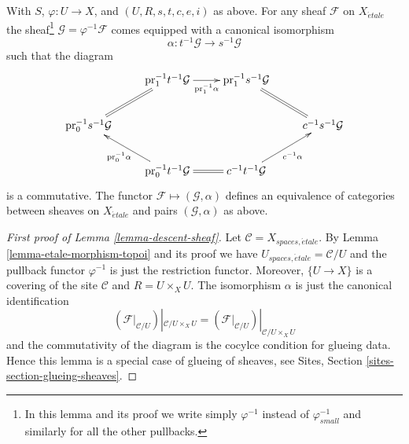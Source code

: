 \begin{lemma}
\label{lemma-descent-sheaf}
With $S$, $\varphi : U \to X$, and $(U, R, s, t, c, e, i)$ as above.
For any sheaf $\mathcal{F}$ on $X_{\acute{e}tale}$ the
sheaf\footnote{In this lemma
and its proof we write simply $\varphi^{-1}$ instead of $\varphi_{small}^{-1}$
and similarly for all the other pullbacks.}
$\mathcal{G} = \varphi^{-1}\mathcal{F}$ comes equipped with a canonical
isomorphism
$$
\alpha :
t^{-1}\mathcal{G}
\longrightarrow
s^{-1}\mathcal{G}
$$
such that the diagram
$$
\xymatrix{
& \text{pr}_1^{-1}t^{-1}\mathcal{G} \ar[r]_-{\text{pr}_1^{-1}\alpha} &
\text{pr}_1^{-1}s^{-1}\mathcal{G} \ar@{=}[rd] & \\
\text{pr}_0^{-1}s^{-1}\mathcal{G} \ar@{=}[ru] & & &
c^{-1}s^{-1}\mathcal{G} \\
&
\text{pr}_0^{-1}t^{-1}\mathcal{G} \ar[lu]^{\text{pr}_0^{-1}\alpha} \ar@{=}[r] &
c^{-1}t^{-1}\mathcal{G} \ar[ru]_{c^{-1}\alpha}
}
$$
is a commutative. The functor $\mathcal{F} \mapsto (\mathcal{G}, \alpha)$
defines an equivalence of categories between sheaves on
$X_{\acute{e}tale}$ and pairs $(\mathcal{G}, \alpha)$ as above.
\end{lemma}

\begin{proof}[First proof of Lemma \ref{lemma-descent-sheaf}]
Let $\mathcal{C} = X_{spaces, \acute{e}tale}$. By
Lemma \ref{lemma-etale-morphism-topoi}
and its proof we have $U_{spaces, \acute{e}tale} = \mathcal{C}/U$
and the pullback functor $\varphi^{-1}$ is just the restriction functor. 
Moreover, $\{U \to X\}$ is a covering of the site $\mathcal{C}$ and
$R = U \times_X U$. The isomorphism $\alpha$ is just the canonical
identification
$$
\left(\mathcal{F}|_{\mathcal{C}/U}\right)|_{\mathcal{C}/U \times_X U}
=
\left(\mathcal{F}|_{\mathcal{C}/U}\right)|_{\mathcal{C}/U \times_X U}
$$
and the commutativity of the diagram is the cocylce condition for glueing
data. Hence this lemma is a special case of glueing of sheaves, see
Sites, Section \ref{sites-section-glueing-sheaves}.
\end{proof}

